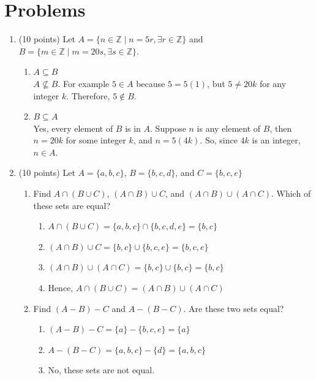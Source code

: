 \documentclass[12pt]{article}
\begin{document}
\section*{Problems}
\begin{enumerate}
	\item (10 points) Let \( A = \{n \in \mathbb{Z} \mid n = 5r, \exists r \in \mathbb{Z}\} \) and \( B = \{m \in \mathbb{Z} \mid m = 20s, \exists s \in \mathbb{Z}\} \).
	      \begin{enumerate}

		      \item \( A \subseteq B \) \\
		            \(A \not \subseteq B\). For example $5 \in A$ because $5 = 5(1)$, but $5 \neq 20k$ for any integer $k$. Therefore, $5 \notin B$.
		      \item \( B \subseteq A \) \\
		            Yes, every element of $B$ is in $A$. Suppose $n$ is any element of $B$, then $n = 20k$ for some integer $k$, and $n = 5(4k)$. So, since $4k$ is an integer, $n \in A$.
	      \end{enumerate}

	\item (10 points) Let \( A = \{a, b, c\} \), \( B = \{b, c, d\} \), and \( C = \{b, c, e\} \)
	      \begin{enumerate}
		      \item Find \( A \cap (B \cup C) \), \( (A \cap B) \cup C \), and \( (A \cap B) \cup (A \cap C) \). Which of these sets are equal?
		            \begin{enumerate}
			            \item \( A \cap (B \cup C) = \{a,b,c\} \cap \{b,c,d,e\} = \{b,c\}\)
			            \item \( (A \cap B) \cup C = \{b,c\} \cup \{b,c,e\} = \{b,c,e\} \)
			            \item \( (A \cap B) \cup (A \cap C) = \{b,c\} \cup \{b, c\} = \{b,c\} \)
			            \item Hence, \( A \cap (B \cup C) = (A \cap B) \cup(A\cap C)\)
		            \end{enumerate}
		      \item Find \( (A - B) - C \) and \( A - (B - C) \). Are these two sets equal?
		            \begin{enumerate}
			            \item \( (A - B) - C = \{a\} - \{b,c,e\} = \{a\} \)
			            \item \( A - (B - C) = \{a,b,c\} - \{d\} = \{a,b,c\}\)
			            \item No, these sets are not equal.
		            \end{enumerate}
	      \end{enumerate}


\end{enumerate}
\end{document}
